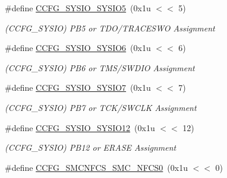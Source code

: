\begin{DoxyCompactItemize}
\mbox{\label{group__SAMS70__MATRIX_ga7700a8793de58ee46189b3af593300ca}} 
\#define \mbox{\hyperlink{group__SAMS70__MATRIX_ga7700a8793de58ee46189b3af593300ca}{C\+C\+F\+G\+\_\+\+S\+Y\+S\+I\+O\+\_\+\+S\+Y\+S\+I\+O5}}~(0x1u $<$$<$ 5)
\begin{DoxyCompactList}\small\item\em (C\+C\+F\+G\+\_\+\+S\+Y\+S\+IO) P\+B5 or T\+D\+O/\+T\+R\+A\+C\+E\+S\+WO Assignment \end{DoxyCompactList}\item 
\mbox{\label{group__SAMS70__MATRIX_ga2ed6a8e8801f4a9f5751e5cdaa6a7615}} 
\#define \mbox{\hyperlink{group__SAMS70__MATRIX_ga2ed6a8e8801f4a9f5751e5cdaa6a7615}{C\+C\+F\+G\+\_\+\+S\+Y\+S\+I\+O\+\_\+\+S\+Y\+S\+I\+O6}}~(0x1u $<$$<$ 6)
\begin{DoxyCompactList}\small\item\em (C\+C\+F\+G\+\_\+\+S\+Y\+S\+IO) P\+B6 or T\+M\+S/\+S\+W\+D\+IO Assignment \end{DoxyCompactList}\item 
\mbox{\label{group__SAMS70__MATRIX_ga28b95aaca8e016fcacd6042b589a1084}} 
\#define \mbox{\hyperlink{group__SAMS70__MATRIX_ga28b95aaca8e016fcacd6042b589a1084}{C\+C\+F\+G\+\_\+\+S\+Y\+S\+I\+O\+\_\+\+S\+Y\+S\+I\+O7}}~(0x1u $<$$<$ 7)
\begin{DoxyCompactList}\small\item\em (C\+C\+F\+G\+\_\+\+S\+Y\+S\+IO) P\+B7 or T\+C\+K/\+S\+W\+C\+LK Assignment \end{DoxyCompactList}\item 
\mbox{\label{group__SAMS70__MATRIX_ga9e6590c0ddc9425df1a4eefaf2b041e4}} 
\#define \mbox{\hyperlink{group__SAMS70__MATRIX_ga9e6590c0ddc9425df1a4eefaf2b041e4}{C\+C\+F\+G\+\_\+\+S\+Y\+S\+I\+O\+\_\+\+S\+Y\+S\+I\+O12}}~(0x1u $<$$<$ 12)
\begin{DoxyCompactList}\small\item\em (C\+C\+F\+G\+\_\+\+S\+Y\+S\+IO) P\+B12 or E\+R\+A\+SE Assignment \end{DoxyCompactList}\item 
\mbox{\label{group__SAMS70__MATRIX_gabd95ec8866de0fb2ae4d7c7bccfa0f01}} 
\#define \mbox{\hyperlink{group__SAMS70__MATRIX_gabd95ec8866de0fb2ae4d7c7bccfa0f01}{C\+C\+F\+G\+\_\+\+S\+M\+C\+N\+F\+C\+S\+\_\+\+S\+M\+C\+\_\+\+N\+F\+C\+S0}}~(0x1u $<$$<$ 0)
$$
\end{DoxyCompactItemize}
